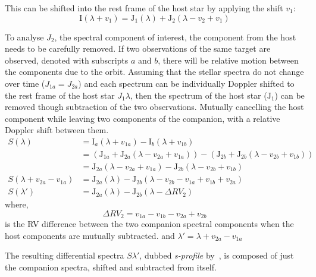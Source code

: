This can be shifted into the rest frame of the host star by applying the shift \(v_1\):
\begin{equation}
\textrm{I}(\lambda + v_{1}) = \textrm{J}_{1}(\lambda) + \textrm{J}_{2}(\lambda - v_{2} + v_{1})
\end{equation}

To analyse \(J_2\), the spectral component of interest, the component from the host needs to be carefully removed.
If two observations of the same target are observed, denoted with subscripts \(a\) and \(b\), there will be relative motion between the components due to the orbit.
Assuming that the stellar spectra do not change over time (\(J_{1a} = J_{2a}\)) and each spectrum can be individually Doppler shifted to the rest frame of the host star \(J_1{\lambda}\), then the spectrum of the host star (\(\textrm{J}_{1}\)) can be removed though subtraction of the two observations.
Mutually cancelling the host component while leaving two components of the companion, with a relative Doppler shift between them.
\begin{align}
S(\lambda) &= \textrm{I}_{a}(\lambda + v_{1a}) - \textrm{I}_{b}(\lambda + v_{1b}) \nonumber \\
&= (\textrm{J}_{1a} + \textrm{J}_{2a}(\lambda - v_{2a} + v_{1a})) - (\textrm{J}_{2b} +\textrm{J}_{2b}(\lambda - v_{2b} + v_{1b})) \nonumber \\
&= \textrm{J}_{2a}(\lambda - v_{2a} + v_{1a}) - \textrm{J}_{2b}(\lambda - v_{2b} + v_{1b}) \nonumber \\
S(\lambda + v_{2a}-v_{1a}) &= \textrm{J}_{2a}(\lambda) - \textrm{J}_{2b}(\lambda - v_{2b} - v_{1a} + v_{1b} + v_{2a})\\
S(\lambda') &= \textrm{J}_{2a}(\lambda) - \textrm{J}_{2b}(\lambda - \Delta {RV}_2) \label{eqn:sprofile}
\end{align}
where,
\begin{equation}
\Delta {RV}_2 = v_{1a} - v_{1b} - v_{2a} + v_{2b} \label{eqn:companion_difference}
\end{equation}
is the {RV} difference between the two companion spectral components when the host components are mutually subtracted.
and \(\lambda' = \lambda + v_{2a}-v_{1a}\)

The resulting differential spectra \(S{\lambda'}\), dubbed \emph{s-profile} by~\citet{ferluga_separating_1997}, is composed of just the companion spectra, shifted and subtracted from itself.

